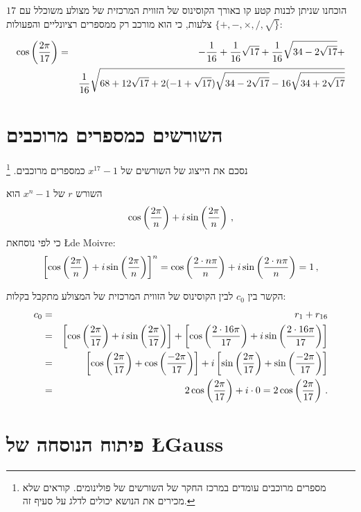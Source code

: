 הוכחנו שניתן לבנות קטע קו באורך הקוסינוס של הזווית המרכזית של מצולע משוכלל עם 
$17$
צלעות, כי הוא מורכב רק ממספרים רציונליים והפעולות 
$\{+,-,\times,/,\surd\}$:

\begin{eqnarray*}
\cos\left(\displaystyle\frac{2\pi}{17}\right) &=& 
-\displaystyle\frac{1}{16}+\displaystyle\frac{1}{16}\sqrt{17} + 
     \displaystyle\frac{1}{16}\sqrt{34-2\sqrt{17}}
    + \\
    &&
     \displaystyle\frac{1}{16}\sqrt{
     68+12\sqrt{17} + 
     2(-1+\sqrt{17})\sqrt{34-2\sqrt{17}}
   -16
     \sqrt{34+2\sqrt{17}}
   }
\end{eqnarray*}



\section{השורשים כמספרים מרוכבים}

נסכם את הייצוג של השורשים של
$x^{17}-1$
כמספרים מרוכבים.%
\footnote{%
מספרים מרוכבים עומדים במרכז החקר של השורשים של פולינומים. קוראים שלא מכירים את הנושא יכולים לדלג על סעיף זה.}

השורש
$r$
של
$x^n-1$
הוא
\[
\cos \left(\displaystyle\frac{2\pi}{n}\right) + i\sin  \left(\displaystyle\frac{2\pi}{n}\right)\,,
\]
כי לפי נוסחאת
\L{de Moivre}:
\[
\left[\cos \left(\displaystyle\frac{2\pi}{n}\right) + i\sin  \left(\displaystyle\frac{2\pi}{n}\right)\right]^{n}=
\cos \left(\displaystyle\frac{2\cdot n\pi}{n}\right) + i\sin  \left(\displaystyle\frac{2\cdot n\pi}{n}\right)= 1\,,
\]



הקשר בין 
$c_0$
לבין הקוסינוס של הזווית המרכזית של המצולע מתקבל בקלות:
\begin{eqnarray*}
c_0&=&r_1+r_{16}\\
&=&\left[\cos\left(\displaystyle\frac{2\pi}{17}\right)+i\sin\left(\displaystyle\frac{2\pi}{17}\right)\right]+\left[\cos\left(\displaystyle\frac{2\cdot 16\pi}{17}\right)+i\sin\left(\displaystyle\frac{2\cdot 16\pi}{17}\right)\right]\\
&=&\left[\cos\left(\displaystyle\frac{2\pi}{17}\right)+\cos\left(\displaystyle\frac{-2\pi}{17}\right)\right]+i\left[\sin\left(\displaystyle\frac{2\pi}{17}\right)+\sin\left(\displaystyle\frac{-2\pi}{17}\right)\right]\\
&=&2\cos\left(\displaystyle\frac{2\pi}{17}\right)+i\cdot 0=2\cos\left(\displaystyle\frac{2\pi}{17}\right)\,.
\end{eqnarray*}



\section{פיתוח הנוסחה של %
\L{Gauss}%
}\label{s.derivation}

